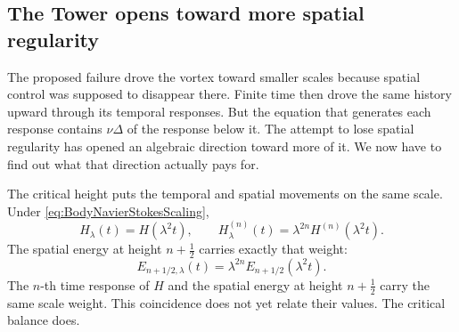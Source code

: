 \subsection{The Tower opens toward more spatial regularity}\label{sub:ThePressureCompleteMixedDerivativeTower}

The proposed failure drove the vortex toward smaller scales because spatial
control was supposed to disappear there.  Finite time then drove the same
history upward through its temporal responses.  But the equation that
generates each response contains \(\nu\Delta\) of the response below it.  The
attempt to lose spatial regularity has opened an algebraic direction toward
more of it.  We now have to find out what that direction actually pays for.

The critical height puts the temporal and spatial movements on the same scale.
Under
\eqref{eq:BodyNavierStokesScaling},
\[
  H_\lambda(t)=H(\lambda^2t),
  \qquad
  H_\lambda^{(n)}(t)
  =\lambda^{2n}H^{(n)}(\lambda^2t).
\]
The spatial energy at height \(n+\tfrac12\) carries exactly that weight:
\[
  E_{n+1/2,\lambda}(t)
  =\lambda^{2n}E_{n+1/2}(\lambda^2t).
\]
The \(n\)-th time response of \(H\) and the spatial energy at height
\(n+\tfrac12\) carry the same scale weight.  This coincidence does not yet
relate their values.  The critical balance does.

